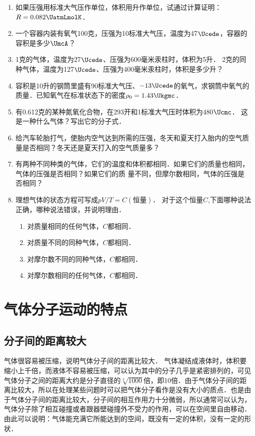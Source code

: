 \begin{enumerate}
    \item 如果压强用标准大气压作单位，体积用升作单位，试通过计算证明：$R=0.082 \UatmLmolK $．
\item 一个容器内装有氧气100克，压强为10标准大气压，温度为47$\Ucede$，容器的容积是多少$\UmcA$？
\item 1克的气体，温度为27$\Ucede$、压强为600毫米汞柱时，体积为5升．
2克的同种气体，温度为127$\Ucede$、压强为400毫米汞柱时，体积是多少升？
\item 容积是10升的钢筒里盛有90标准大气压、$-13 \Ucede $的氧气，求钢筒中氧气的质量．已知氧气在标准状态下的密度$\rho_0=1.43 \Ukgmc$．
\item 有0.612克的某种氮氧化合物，在293开和1标准大气压时体积为480$\Ucmc$．
这是一种什么气体？写出它的分子式．
\item 给汽车轮胎打气，使胎内空气达到所需的压强，冬天和夏天打入胎内的空气质量是否相同？冬天还是夏天打入的空气质量多？
\item 有两种不同种类的气体，它们的温度和体积都相同．如果它们的质量也相同，气体的压强是否相同？如果它们的质
量不同，但摩尔数相同，气体的压强是否相同？
\item 理想气体的状态方程可写成$pV/T=C(\text{恒量})$．
对于这个恒量$C$,下面哪种说法正确，哪种说法错误，并说明理由．
\begin{enumerate}
\item 对质量相同的任何气体，$C$都相同．
\item 对质量不同的同种气体，$C$都相同．    
\item 对摩尔数不同的同种气体，$C$都相同．
\item 对摩尔数相同的任何气体，$C$都相同．
\end{enumerate}
\end{enumerate}

\section{气体分子运动的特点}\label{sec-B-3-7-characteristics-of-gas-molecular-motion}
\subsection{分子间的距离较大} 
气体很容易被压缩，说明气体分子间的距离比较大．
气体凝结成液体时，体积要缩小上千倍，而液体不容易被压缩，可以认为其中的分子几乎是紧密排列的，可见气体分子之间的距离大约是分子直径的$\sqrt[3]{1000}$倍，即10倍．由于气体分子间的距离比较大，所以在处理某些问题时可以把气体分子看作是没有大小的质点．也是由于气体分子间的距离比较大，分子间的相互作用力十分微弱，所以通常可以认为，气体分子除了相互碰撞或者跟器壁碰撞外不受力的作用，可以在空间里自由移动．由此可以说明：气体能充满它所能达到的空间，既没有一定的体积，没有一定的形状．

